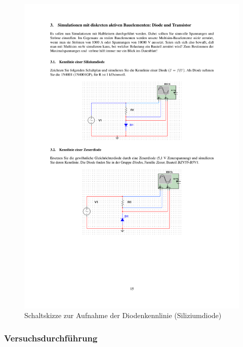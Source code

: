 \documentclass[12pt,a4paper]{article}
\begin{document}
\begin{figure}[H] 
  \centering
    \includegraphics[trim = 10mm 160mm 10mm 75mm, clip, scale = 1]{ep5_14[Page15].pdf}
  	\caption[Schaltskizze zur Aufnahme der Diodenkennlinie (Siliziumdiode)]{Schaltskizze zur Aufnahme der Diodenkennlinie (Siliziumdiode)\footnotemark}
  \label{fig:1}
\end{figure}

\subsubsection{Versuchsdurchführung}
\end{document}
